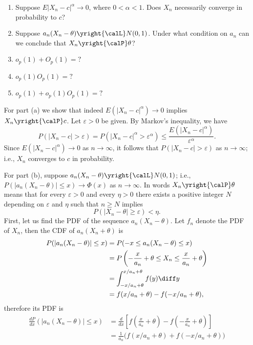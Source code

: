 \begin{problem}[DasGupta 7.2 (a), (b), (c), (d), (e)]
  \begin{enumerate}[label=(\alph*),noitemsep]
  \item Suppose \(E|X_n-c|^\alpha\to 0\), where \(0<\alpha<1\). Does
    \(X_n\) necessarily converge in probability to \(c\)?
  \item Suppose \(a_n(X_n-\theta)\yright{\calL}N(0,1)\). Under what
    condition on \(a_n\) can we conclude that \(X_n\yright{\calP}\theta\)?
  \item \(o_p(1)+O_p(1)=?\)
  \item \(o_p(1)O_p(1)=?\)
  \item \(o_p(1)+o_p(1)O_p(1)=?\)
  \end{enumerate}
\end{problem}
\begin{solution}
  For part (a) we show that indeed \(E(|X_n-c|^\alpha)\to 0\) implies
  \(X_n\yright{\calP}c\). Let \(\varepsilon>0\) be given. By Markov's
  inequality, we have
  \[
    P(|X_n-c|>\varepsilon)=
    P(|X_n-c|^\alpha>\varepsilon^\alpha)
    \leq\frac{E(|X_n-c|^\alpha)}{\varepsilon^\alpha}.
  \]
  Since \(E(|X_n-c|^\alpha)\to 0\) as \(n\to\infty\), it follows that
  \(P(|X_n-c|>\varepsilon)\) as \(n\to\infty\); i.e., \(X_n\) converges to
  \(c\) in probability.

  For part (b), suppose \(a_n(X_n-\theta)\yright{\calL}N(0,1)\); i.e.,
  \(P(|a_n(X_n-\theta)|\leq x)\to\Phi(x)\) as \(n\to\infty\). In words
  \(X_n\yright{\calP}\theta\) means that for every \(\varepsilon>0\) and
  every \(\eta>0\) there exists a positive integer \(N\) depending on
  \(\varepsilon\) and \(\eta\) such that \(n\geq N\) implies
  \[
    P(|X_n-\theta|\geq\varepsilon)<\eta.
  \]
  First, let us find the PDF of the sequence \(a_n(X_n-\theta)\). Let \(f_n\)
  denote the PDF of \(X_n\), then the CDF of \(a_n(X_n+\theta)\) is
  \begin{align*}
    P(|a_n(X_n-\theta)|\leq x)
    &=P(-x\leq a_n(X_n-\theta)\leq x)\\
    &=P\left(-\frac{x}{a_n}+\theta\leq X_n\leq\frac{x}{a_n}+\theta\right)\\
    &=\int_{-x/a_n+\theta}^{x/a_n+\theta} f(y)\diff y\\
    &=f(x/a_n+\theta)
      -f(-x/a_n+\theta),
  \end{align*}
  therefore its PDF is
  \begin{align*}
    \frac{dP}{dx}(|a_n(X_n-\theta)|\leq x)
    &=\frac{d}{dx}
      \left[%
      f\left(\frac{x}{a_n}+\theta\right)%
      -f\left(-\frac{x}{a_n}+\theta\right)%
      \right]\\
    &=\frac{1}{a_n}\bigl(f(x/a_n+\theta)+f(-x/a_n+\theta)\bigr)
  \end{align*}


\end{solution}
